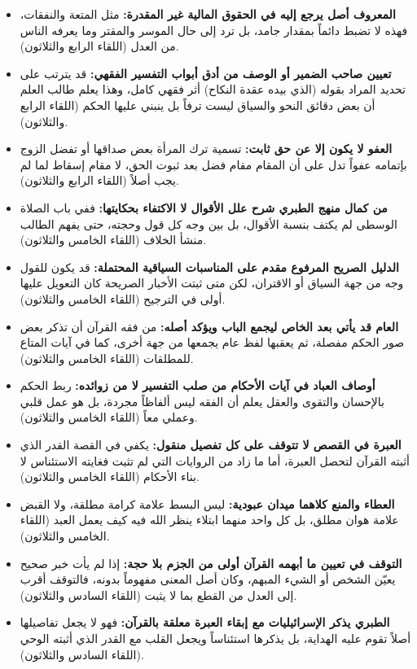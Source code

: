 \begin{itemize}
    \item \textbf{المعروف أصل يرجع إليه في الحقوق المالية غير المقدرة:} مثل المتعة والنفقات، فهذه لا تضبط دائماً بمقدار جامد، بل ترد إلى حال الموسر والمقتر وما يعرفه الناس من العدل (اللقاء الرابع والثلاثون).
    \item \textbf{تعيين صاحب الضمير أو الوصف من أدق أبواب التفسير الفقهي:} قد يترتب على تحديد المراد بقوله (الذي بيده عقدة النكاح) أثر فقهي كامل، وهذا يعلم طالب العلم أن بعض دقائق النحو والسياق ليست ترفاً بل ينبني عليها الحكم (اللقاء الرابع والثلاثون).
    \item \textbf{العفو لا يكون إلا عن حق ثابت:} تسمية ترك المرأة بعض صداقها أو تفضل الزوج بإتمامه عفواً تدل على أن المقام مقام فضل بعد ثبوت الحق، لا مقام إسقاط لما لم يجب أصلاً (اللقاء الرابع والثلاثون).
    \item \textbf{من كمال منهج الطبري شرح علل الأقوال لا الاكتفاء بحكايتها:} ففي باب الصلاة الوسطى لم يكتف بنسبة الأقوال، بل بين وجه كل قول وحجته، حتى يفهم الطالب منشأ الخلاف (اللقاء الخامس والثلاثون).
    \item \textbf{الدليل الصريح المرفوع مقدم على المناسبات السياقية المحتملة:} قد يكون للقول وجه من جهة السياق أو الاقتران، لكن متى ثبتت الأخبار الصريحة كان التعويل عليها أولى في الترجيح (اللقاء الخامس والثلاثون).
    \item \textbf{العام قد يأتي بعد الخاص ليجمع الباب ويؤكد أصله:} من فقه القرآن أن تذكر بعض صور الحكم مفصلة، ثم يعقبها لفظ عام يجمعها من جهة أخرى، كما في آيات المتاع للمطلقات (اللقاء الخامس والثلاثون).
    \item \textbf{أوصاف العباد في آيات الأحكام من صلب التفسير لا من زوائده:} ربط الحكم بالإحسان والتقوى والعقل يعلم أن الفقه ليس ألفاظاً مجردة، بل هو عمل قلبي وعملي معاً (اللقاء الخامس والثلاثون).
    \item \textbf{العبرة في القصص لا تتوقف على كل تفصيل منقول:} يكفي في القصة القدر الذي أثبته القرآن لتحصل العبرة، أما ما زاد من الروايات التي لم تثبت فغايته الاستئناس لا بناء الأحكام (اللقاء الخامس والثلاثون).
    \item \textbf{العطاء والمنع كلاهما ميدان عبودية:} ليس البسط علامة كرامة مطلقة، ولا القبض علامة هوان مطلق، بل كل واحد منهما ابتلاء ينظر الله فيه كيف يعمل العبد (اللقاء الخامس والثلاثون).
    \item \textbf{التوقف في تعيين ما أبهمه القرآن أولى من الجزم بلا حجة:} إذا لم يأت خبر صحيح يعيّن الشخص أو الشيء المبهم، وكان أصل المعنى مفهوماً بدونه، فالتوقف أقرب إلى العدل من القطع بما لا يثبت (اللقاء السادس والثلاثون).
    \item \textbf{الطبري يذكر الإسرائيليات مع إبقاء العبرة معلقة بالقرآن:} فهو لا يجعل تفاصيلها أصلاً تقوم عليه الهداية، بل يذكرها استئناساً ويجعل القلب مع القدر الذي أثبته الوحي (اللقاء السادس والثلاثون).

\end{itemize}
